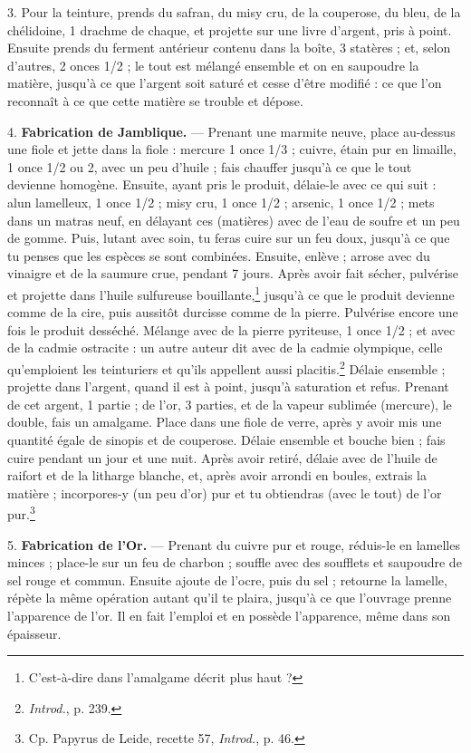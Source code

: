\documentclass[a4paper, 11pt, oneside, polutonikogreek, french]{article}
\begin{document}
3. Pour la teinture, prends du safran, du misy cru, de la couperose, du bleu, de la chélidoine, 1 drachme de chaque, et projette sur une livre d'argent, pris à point. Ensuite prends du ferment antérieur contenu dans la boîte, 3 statères ; et, selon d'autres, 2 onces 1/2 ; le tout est mélangé ensemble et on en saupoudre la matière, jusqu'à ce que l'argent soit saturé et cesse d'être modifié : ce que l'on reconnaît à ce que cette matière se trouble et dépose.

4. \textbf{Fabrication de Jamblique.} --- Prenant une marmite neuve, place au-dessus une fiole et jette dans la fiole : mercure 1 once 1/3 ; cuivre, étain pur en limaille, 1 once 1/2 ou 2, avec un peu d'huile ; fais chauffer jusqu'à ce que le tout devienne homogène. Ensuite, ayant pris le produit, délaie-le avec ce qui suit : alun lamelleux, 1 once 1/2 ; misy cru, 1 once 1/2 ; arsenic, 1 once 1/2 ; mets dans un matras neuf, en délayant ces (matières) avec de l'eau de soufre et un peu de gomme. Puis, lutant avec soin, tu feras cuire sur un feu doux, jusqu'à ce que tu penses que les espèces se sont combinées. Ensuite, enlève ; arrose avec du vinaigre et de la saumure crue, pendant 7 jours. Après avoir fait sécher, pulvérise et projette dans l'huile sulfureuse bouillante,\footnote{C'est-à-dire dans l'amalgame décrit plus haut ?} jusqu'à ce que le produit devienne comme de la cire, puis aussitôt durcisse comme de la pierre. Pulvérise encore une fois le produit desséché. Mélange avec de la pierre pyriteuse, 1 once 1/2 ; et avec de la cadmie ostracite : un autre auteur dit avec de la cadmie olympique, celle qu'emploient les teinturiers et qu'ils appellent aussi placitis.\footnote{\emph{Introd.}, p. 239.} Délaie ensemble ; projette dans l'argent, quand il est à point, jusqu'à saturation et refus. Prenant de cet argent, 1 partie ; de l'or, 3 parties, et de la vapeur sublimée (mercure), le double, fais un amalgame. Place dans une fiole de verre, après y avoir mis une quantité égale de sinopis et de couperose. Délaie ensemble et bouche bien ; fais cuire pendant un jour et une nuit. Après avoir retiré, délaie avec de l'huile de raifort et de la litharge blanche, et, après avoir arrondi en boules, extrais la matière ; incorpores-y (un peu d'or) pur et tu obtiendras (avec le tout) de l'or pur.\footnote{Cp. Papyrus de Leide, recette 57, \emph{Introd.}, p. 46.}

5. \textbf{Fabrication de l'Or.} --- Prenant du cuivre pur et rouge, réduis-le en lamelles minces ; place-le sur un feu de charbon ; souffle avec des soufflets et saupoudre de sel rouge et commun. Ensuite ajoute de l'ocre, puis du sel ; retourne la lamelle, répète la même opération autant qu'il te plaira, jusqu'à ce que l'ouvrage prenne l'apparence de l'or. Il en fait l'emploi et en possède l'apparence, même dans son épaisseur.
\end{document}
